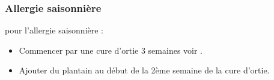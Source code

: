 \subsubsection{Allergie saisonnière}

pour l'allergie saisonnière : 
\begin{itemize}[label=\bcbook]
    \item Commencer par une cure d'ortie 3 semaines voir .
    \item Ajouter du plantain au début de la 2ème semaine de la cure d'ortie.
\end{itemize}
